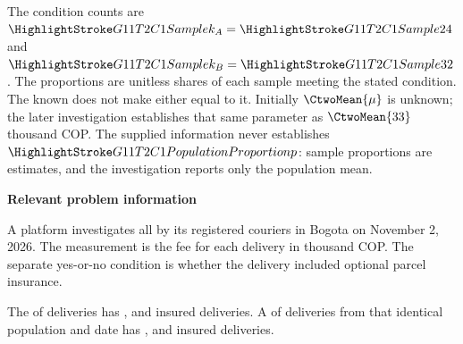 The condition counts are $\Sam{k_A}=\Sam{24}$ and $\Sam{k_B}=\Sam{32}$. The proportions are unitless shares of each sample meeting the stated condition. The known  does not make either  equal to it. Initially $\CtwoMean{\mu}$ is unknown; the later investigation establishes that same parameter as $\CtwoMean{33}$ thousand COP. The supplied information never establishes $\PP{p}$: sample proportions are estimates, and the investigation reports only the population mean.

\secInicio[][sec:p3]

\clearpage



\textbf{Relevant problem information}

\begin{probleminfoexcerpt}
A platform investigates all    by its registered couriers in Bogota on November 2, 2026. The measurement is the fee for each delivery in thousand COP. The separate yes-or-no condition is whether the delivery included optional parcel insurance.
\end{probleminfoexcerpt}

\begin{probleminfoexcerpt}
The     of  deliveries has     ,       and  insured deliveries. A     of  deliveries from that identical population and date has     ,       and  insured deliveries.
\end{probleminfoexcerpt}



